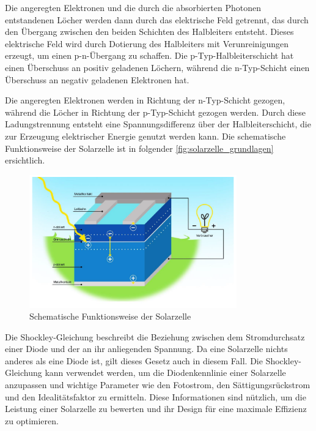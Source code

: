 \documentclass[12pt,english,ngerman]{scrartcl}
\begin{document}
Die angeregten Elektronen und die durch die absorbierten Photonen entstandenen
Löcher werden dann durch das elektrische Feld getrennt, das durch den Übergang
zwischen den beiden Schichten des Halbleiters entsteht. Dieses elektrische Feld
wird durch Dotierung des Halbleiters mit Verunreinigungen erzeugt, um einen
p-n-Übergang zu schaffen. Die p-Typ-Halbleiterschicht hat einen Überschuss an
positiv geladenen Löchern, während die n-Typ-Schicht einen Überschuss an
negativ geladenen Elektronen hat.

Die angeregten Elektronen werden in Richtung der n-Typ-Schicht gezogen, während
die Löcher in Richtung der p-Typ-Schicht gezogen werden. Durch diese
Ladungstrennung entsteht eine Spannungsdifferenz über der Halbleiterschicht,
die zur Erzeugung elektrischer Energie genutzt werden kann. Die schematische
Funktionsweise der Solarzelle ist in folgender
\autoref{fig:solarzelle_grundlagen} ersichtlich.

\begin{figure}[H]
	\begin{center}
		\includegraphics[width =0.8\textwidth]{./figures/solarzelle_grundlagen.PNG}
	\end{center}
	\caption[Schematische Funktionsweise der Solarzelle]{Schematische Funktionsweise der
		Solarzelle~\cite{knoll_solarzelle_nodate}
	}\label{fig:solarzelle_grundlagen}
\end{figure}

Die Shockley-Gleichung beschreibt die Beziehung zwischen dem Stromdurchsatz
einer Diode und der an ihr anliegenden Spannung. Da eine Solarzelle nichts
anderes als eine Diode ist, gilt dieses Gesetz auch in diesem Fall. Die
Shockley-Gleichung kann verwendet werden, um die Diodenkennlinie einer
Solarzelle anzupassen und wichtige Parameter wie den Fotostrom, den
Sättigungsrückstrom und den Idealitätsfaktor zu ermitteln. Diese Informationen
sind nützlich, um die Leistung einer Solarzelle zu bewerten und ihr Design für
eine maximale Effizienz zu optimieren.
\end{document}
